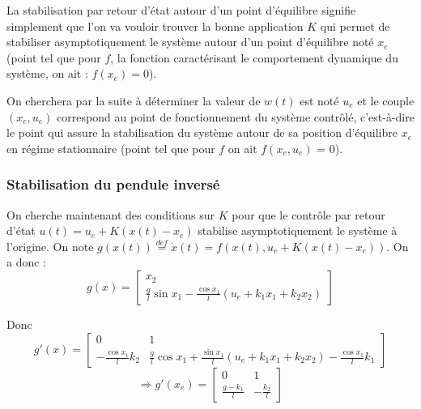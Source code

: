 \documentclass[a4paper]{article}
\begin{document}
                        La stabilisation par retour d'état autour d'un point d'équilibre signifie simplement que l'on va vouloir trouver la bonne application
                        $K$ qui permet de stabiliser asymptotiquement le système autour d'un point d'équilibre noté $x_e$ (point tel que pour $f$, la fonction
                        caractérisant le comportement dynamique du système, on ait : $f(x_e) = 0$).


                        On cherchera par la suite à déterminer la valeur de $w(t)$ est noté $u_e$ et le couple $(x_e,u_e)$ correspond au point de fonctionnement
                        du système contrôlé, c'est-à-dire le point qui assure la stabilisation du système autour de sa position d'équilibre $x_e$ en régime
                        stationnaire (point tel que pour $f$ on ait $f(x_e,u_e)$ = 0).


                        \subsubsection{Stabilisation du pendule inversé}
                        \label{stabilisation_pendule_inverse}

                        On cherche maintenant des conditions sur $K$ pour que le contrôle par retour d'état
                        $u(t) = u_e + K(x(t)-x_e)$ stabilise asymptotiquement le système à l'origine.
                        On note $g(x(t)) \overset{def}{=} \dot x(t) = f(x(t), u_e + K(x(t)-x_e))$.
                        On a donc :
                        $$
                        g(x) = 
                        \begin{bmatrix}
                                x_2 \\
                                \frac{g}{l} \sin x_1 - \frac{\cos x_1}{l} (u_e+k_1x_1+k_2x_2)
                        \end{bmatrix}
                        $$

                        Donc
                        $$
                        g'(x) = 
                        \begin{bmatrix}
                                0 & 1 \\
                                -\frac{\cos x_1}{l} k_2 & \frac{g}{l}\cos x_1 + \frac{\sin x_1}{l}(u_e+k_1x_1+k_2x_2) - \frac{\cos x_1}{l}k_1
                        \end{bmatrix}
                        $$
                        $$
                        \Longrightarrow
                        g'(x_e) =
                        \begin{bmatrix}
                                0 & 1 \\
                                \frac{g-k_1}{l} & -\frac{k_2}{l}
                        \end{bmatrix}
                        $$
\end{document}
